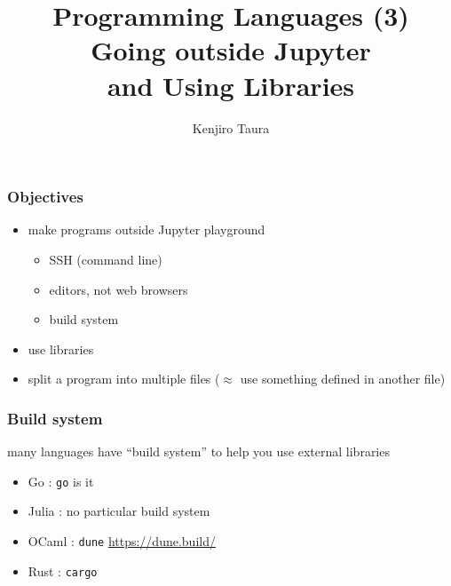 \documentclass[12pt,dvipdfmx]{beamer}
\title{Programming Languages (3) \\
  Going outside Jupyter \\
  and Using Libraries}
\institute{}
\author{Kenjiro Taura}
\date{}
\begin{document}
\maketitle


\begin{frame}
  \frametitle{Objectives}
  \begin{itemize}
  \item make programs outside Jupyter playground
    \begin{itemize}
    \item SSH (command line)
    \item editors, not web browsers
    \item build system
    \end{itemize}
  \item use libraries
  \item split a program into multiple files ($\approx$ use something defined in another file)
  \end{itemize}
\end{frame}

\begin{frame}
  \frametitle{Build system}
  many languages have ``build system'' to help you
    use external libraries
  \begin{itemize}
  \item Go : {\tt go} is it
  \item Julia : no particular build system
  \item OCaml : {\tt dune} \url{https://dune.build/}
  \item Rust : {\tt cargo} 
  \end{itemize}
\end{frame}
\end{document}
